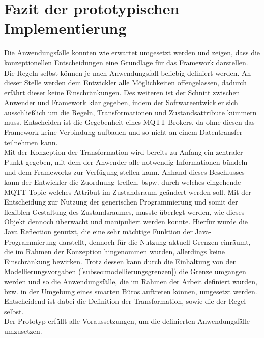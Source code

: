     \section{Fazit der prototypischen Implementierung}
        Die Anwendungsfälle konnten wie erwartet umgesetzt werden und zeigen, dass die konzeptionellen Entscheidungen eine Grundlage für das 
        Framework darstellen. Die Regeln selbst können je nach Anwendungsfall beliebig definiert werden. An dieser Stelle werden dem 
        Entwickler alle Möglichkeiten offengelassen, dadurch erfährt dieser keine Einschränkungen. Des weiteren ist der Schnitt zwischen 
        Anwender und Framework klar gegeben, indem der Softwareentwickler sich ausschließlich um die Regeln, Transformationen und Zustandsattribute 
        kümmern muss. Entscheiden ist die Gegebenheit eines \acs{MQTT}-Brokers, da ohne diesen das Framework keine Verbindung aufbauen und so nicht an 
        einem Datentransfer teilnehmen kann. 
        \\
        \linebreak
        Mit der Konzeption der Transformation wird bereits zu Anfang ein zentraler Punkt gegeben, mit dem der Anwender alle notwendig Informationen 
        bündeln und dem Frameworks zur Verfügung stellen kann. Anhand dieses Beschlusses kann der Entwickler die Zuordnung treffen, bspw. durch welches 
        eingehende \acs{MQTT}-Topic welches Attribut im Zustandsraum geändert werden soll. Mit der Entscheidung zur Nutzung der generischen Programmierung 
        und somit der flexiblen Gestaltung des Zustandsraumes, musste überlegt werden, wie dieses Objekt dennoch überwacht und manipuliert werden konnte. 
        Hierfür wurde die Java Reflection genutzt, die eine sehr mächtige Funktion der Java-Programmierung darstellt, dennoch für die Nutzung aktuell 
        Grenzen einräumt, die im Rahmen der Konzeption hingenommen wurden, allerdings keine Einschränkung bewirken. Trotz dessen kann durch die Einhaltung 
        von den Modellierungsvorgaben (\ref{subsec:modellierungsgrenzen}) die Grenze umgangen werden und so die Anwendungsfälle, die im Rahmen der Arbeit 
        definiert wurden, bzw. in der Umgebung eines smarten Büros auftreten können, umgesetzt werden. Entscheidend ist dabei die Definition der 
        Transformation, sowie die der Regel selbst. 
        \\
        Der Prototyp erfüllt alle Voraussetzungen, um die definierten Anwendungsfälle umzusetzen.
    
